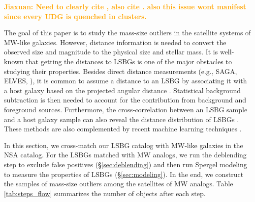 \documentclass[twocolumn,astrosymb,twocolappendix,linenumbers]{aastex631}
\newcommand{\jiaxuan}[1]{\textcolor{orange}{\textbf{Jiaxuan: #1}}}
\begin{document}
\begin{CJK*}{UTF8}{gbsn}
\jiaxuan{Need to clearly cite \citet{Lim2020}, also cite \citet{LaMarca2022,Venhola2022}. also \citep{Trujillo2017,ManceraPina2018} this issue wont manifest since every UDG is quenched in clusters.}


The goal of this paper is to study the mass-size outliers in the satellite systems of MW-like galaxies. However, distance information is needed to convert the observed size and magnitude to the physical size and stellar mass. It is well-known that getting the distances to LSBGs is one of the major obstacles to studying their properties. Besides direct distance measurements (e.g., SAGA, ELVES, \citealt{Kadowaki2021}), it is common to assume a distance to an LSBG by associating it with a host galaxy based on the projected angular distance \citep[e.g.,][]{vanDokkum2015,vdBurg2016,Wang2021,Zaritsky2022,Nashimoto2022}. Statistical background subtraction is then needed to account for the contribution from background and foreground sources. Furthermore, the cross-correlation between an LSBG sample and a host galaxy sample can also reveal the distance distribution of LSBGs \citep{Greene2022}. These methods are also complemented by recent machine learning techniques \citep{Baxter2021,xSAGA-I}. 

In this section, we cross-match our LSBG catalog with MW-like galaxies in the NSA catalog. For the LSBGs matched with MW analogs, we run the deblending step to exclude false positives (\S\ref{sec:deblending}) and then run Spergel modeling to measure the properties of LSBGs (\S\ref{sec:modeling}). In the end, we construct the samples of mass-size outliers among the satellites of MW analogs. Table \ref{tab:steps_flow} summarizes the number of objects after each step. 


\end{CJK*}
\end{document}
